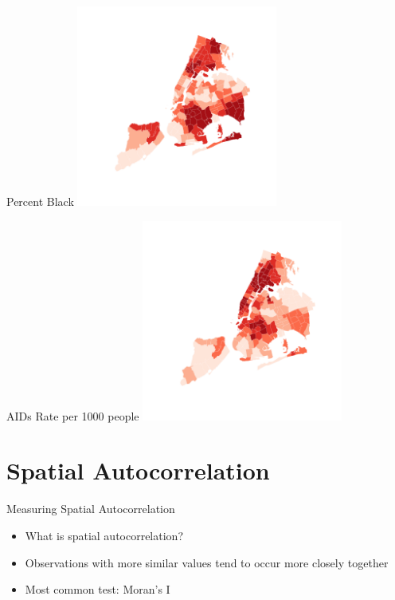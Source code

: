\documentclass[aspectratio = 169, 12pt]{beamer}\usepackage[]{graphicx}\usepackage[]{color}
\newenvironment{knitrout}{}{} %
\begin{document}
\begin{frame}[fragile]{Percent Black}
\begin{knitrout}\tiny
{}\color{fgcolor}
\includegraphics[width=250px]{figure/unnamed-chunk-2-1} 

\end{knitrout}
\end{frame}

\begin{frame}[fragile]{AIDs Rate per 1000 people}
\begin{knitrout}\tiny
{}\color{fgcolor}
\includegraphics[width=250px]{figure/unnamed-chunk-3-1} 

\end{knitrout}

\end{frame}


\section{Spatial Autocorrelation}
\begin{frame}{Measuring Spatial Autocorrelation}
\begin{itemize}
\item What is spatial autocorrelation?
\item Observations with more similar values tend to occur more closely together
\item Most common test: Moran's I
\end{itemize}
\end{frame}
\end{document}
